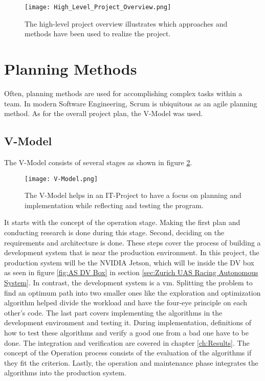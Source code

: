 \begin{figure}[H]
    \centering
    \texttt{[image: High\_Level\_Project\_Overview.png]}
    \caption{The high-level project overview illustrates which approaches and methods have been used to realize the project.}
    \label{fig:High Level Project Overview}
\end{figure}

\section{Planning Methods} \label{sec:Planning Methods}
Often, planning methods are used for accomplishing complex tasks within a team. In modern Software Engineering, Scrum is ubiquitous as an agile planning method. As for the overall project plan, the V-Model was used.

\subsection{V-Model} \label{sec:Planning Method: V-Model}
The V-Model consists of several stages as shown in figure \ref{fig:V-Model}.
\begin{figure}[H]
    \centering
    \texttt{[image: V-Model.png]}
    \caption{The V-Model helps in an IT-Project to have a focus on planning and implementation while reflecting and testing the program.}
    \label{fig:V-Model}
\end{figure}

It starts with the concept of the operation stage. Making the first plan and conducting research is done during this stage. Second, deciding on the requirements and architecture is done. These steps cover the process of building a development system that is near the production environment. In this project, the production system will be the NVIDIA Jetson, which will be inside the DV box as seen in figure \ref{fig:AS DV Box} in section \ref{sec:Zurich UAS Racing Autonomous System}.
In contrast, the development system is a \acrlong{vm}. Splitting the problem to find an optimum path into two smaller ones like the exploration and optimization algorithm helped divide the workload and have the four-eye principle on each other's code. The last part covers implementing the algorithms in the development environment and testing it. During implementation, definitions of how to test these algorithms and verify a good one from a bad one have to be done. The integration and verification are covered in chapter \ref{ch:Results}. The concept of the Operation process consists of the evaluation of the algorithms if they fit the criterion. Lastly, the operation and maintenance phase integrates the algorithms into the production system.

